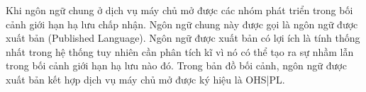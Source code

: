 
Khi   ngôn ngữ chung ở     dịch vụ máy chủ mở  được các nhóm phát triển trong     bối cảnh giới hạn  hạ lưu chấp nhận.   Ngôn ngữ chung này được gọi là  ngôn ngữ được xuất bản (Published Language). Ngôn ngữ  được xuất bản có lợi ích là tính thống nhất trong hệ thống tuy nhiên cần phân tích kĩ  vì nó có thể tạo ra  sự nhầm lẫn trong     bối cảnh giới hạn hạ lưu   nào đó.
Trong bản đồ    bối cảnh,     ngôn ngữ được xuất bản kết hợp dịch vụ máy chủ mở    được ký hiệu là     OHS|PL.
 
 
     